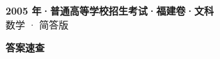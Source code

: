 \documentclass[zihao=-4, a4paper]{ctexart}
\begin{document}
\begin{center}
  {\Large\bfseries 2005 年·普通高等学校招生考试·福建卷·文科}\\[4pt]
  {\large 数学 · 简答版}
\end{center}
\medskip
{}

\clearpage
{}
\begin{center}{\Large\bfseries 答案速查}\end{center}
\medskip

\end{document}
